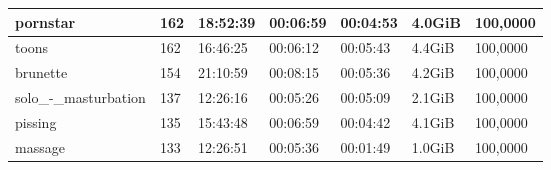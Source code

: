 \begin{table}[]
\begin{tabular}{l|l|l|l|l|l|l}
pornstar                                           & 162                                                 & 18:52:39                                                 & 00:06:59                                                & 00:04:53                                               & 4.0GiB                                               & 100,0000                                                      \\ \hline
toons                                              & 162                                                 & 16:46:25                                                 & 00:06:12                                                & 00:05:43                                               & 4.4GiB                                               & 100,0000                                                      \\ \hline
brunette                                           & 154                                                 & 21:10:59                                                 & 00:08:15                                                & 00:05:36                                               & 4.2GiB                                               & 100,0000                                                      \\ \hline
solo\_-\_masturbation                              & 137                                                 & 12:26:16                                                 & 00:05:26                                                & 00:05:09                                               & 2.1GiB                                               & 100,0000                                                      \\ \hline
pissing                                            & 135                                                 & 15:43:48                                                 & 00:06:59                                                & 00:04:42                                               & 4.1GiB                                               & 100,0000                                                      \\ \hline
massage                                            & 133                                                 & 12:26:51                                                 & 00:05:36                                                & 00:01:49                                               & 1.0GiB                                               & 100,0000                                                      \\ \hline

\end{tabular}
\end{table}
